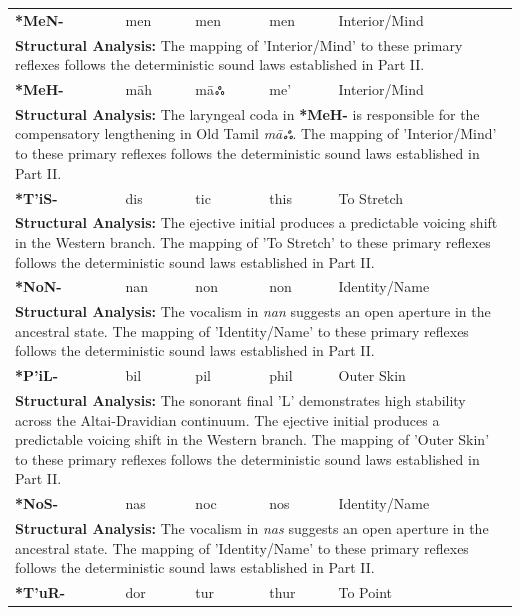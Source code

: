 \begin{longtable}{p{} p{} p{} p{} p{}}
\textbf{*MeN-} & men & men & men & Interior/Mind \\ 
\multicolumn{5}{p{\textwidth}}{\small \textbf{Structural Analysis:}  The mapping of 'Interior/Mind' to these primary reflexes follows the deterministic sound laws established in Part II.} \\ \addlinespace[15pt] 
\textbf{*MeH-} & māh & māஃ & me' & Interior/Mind \\ 
\multicolumn{5}{p{\textwidth}}{\small \textbf{Structural Analysis:} The laryngeal coda in \textbf{*MeH-} is responsible for the compensatory lengthening in Old Tamil \textit{māஃ}. The mapping of 'Interior/Mind' to these primary reflexes follows the deterministic sound laws established in Part II.} \\ \addlinespace[15pt] 
\textbf{*T'iS-} & dis & tic & this & To Stretch \\ 
\multicolumn{5}{p{\textwidth}}{\small \textbf{Structural Analysis:} The ejective initial produces a predictable voicing shift in the Western branch. The mapping of 'To Stretch' to these primary reflexes follows the deterministic sound laws established in Part II.} \\ \addlinespace[15pt] 
\textbf{*NoN-} & nan & non & non & Identity/Name \\ 
\multicolumn{5}{p{\textwidth}}{\small \textbf{Structural Analysis:} The vocalism in \textit{nan} suggests an open aperture in the ancestral state. The mapping of 'Identity/Name' to these primary reflexes follows the deterministic sound laws established in Part II.} \\ \addlinespace[15pt] 
\textbf{*P'iL-} & bil & pil & phil & Outer Skin \\ 
\multicolumn{5}{p{\textwidth}}{\small \textbf{Structural Analysis:} The sonorant final 'L' demonstrates high stability across the Altai-Dravidian continuum. The ejective initial produces a predictable voicing shift in the Western branch. The mapping of 'Outer Skin' to these primary reflexes follows the deterministic sound laws established in Part II.} \\ \addlinespace[15pt] 
\textbf{*NoS-} & nas & noc & nos & Identity/Name \\ 
\multicolumn{5}{p{\textwidth}}{\small \textbf{Structural Analysis:} The vocalism in \textit{nas} suggests an open aperture in the ancestral state. The mapping of 'Identity/Name' to these primary reflexes follows the deterministic sound laws established in Part II.} \\ \addlinespace[15pt] 
\textbf{*T'uR-} & dor & tur & thur & To Point \\ 

\end{longtable}
